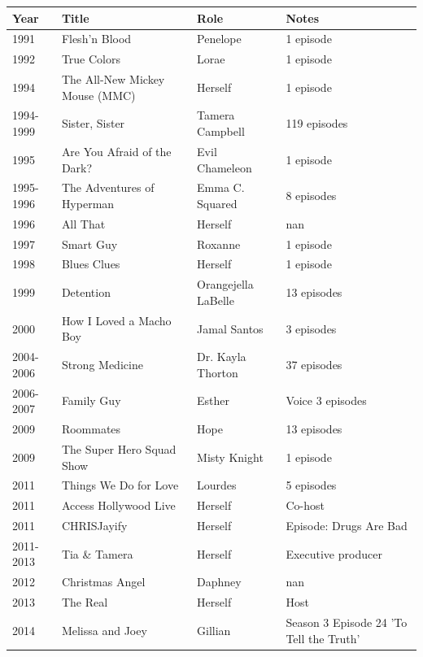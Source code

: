 \documentclass{article}
\begin{document}
\begin{tabular}{llll}
\toprule
Year & Title & Role & Notes \\
\midrule
1991 & Flesh'n Blood & Penelope & 1 episode \\
1992 & True Colors & Lorae & 1 episode \\
1994 & The All-New Mickey Mouse (MMC) & Herself & 1 episode \\
1994-1999 & Sister, Sister & Tamera Campbell & 119 episodes \\
1995 & Are You Afraid of the Dark? & Evil Chameleon & 1 episode \\
1995-1996 & The Adventures of Hyperman & Emma C. Squared & 8 episodes \\
1996 & All That & Herself & nan \\
1997 & Smart Guy & Roxanne & 1 episode \\
1998 & Blues Clues & Herself & 1 episode \\
1999 & Detention & Orangejella LaBelle & 13 episodes \\
2000 & How I Loved a Macho Boy & Jamal Santos & 3 episodes \\
2004-2006 & Strong Medicine & Dr. Kayla Thorton & 37 episodes \\
2006-2007 & Family Guy & Esther & Voice 3 episodes \\
2009 & Roommates & Hope & 13 episodes \\
2009 & The Super Hero Squad Show & Misty Knight & 1 episode \\
2011 & Things We Do for Love & Lourdes & 5 episodes \\
2011 & Access Hollywood Live & Herself & Co-host \\
2011 & CHRISJayify & Herself & Episode: Drugs Are Bad \\
2011-2013 & Tia \& Tamera & Herself & Executive producer \\
2012 & Christmas Angel & Daphney & nan \\
2013 & The Real & Herself & Host \\
2014 & Melissa and Joey & Gillian & Season 3 Episode 24 'To Tell the Truth' \\
\bottomrule
\end{tabular}
\end{document}
